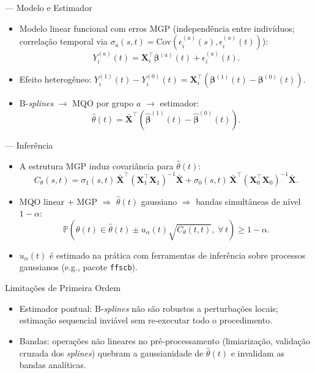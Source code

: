 \documentclass{beamer}
\begin{document}
\begin{frame}{ — Modelo e Estimador}
\begin{itemize}
    \item Modelo linear funcional com erros MGP (independência entre indivíduos; correlação temporal via \(\sigma_a(s,t) = \mathrm{Cov}(\epsilon_i^{(a)}(s),\epsilon_i^{(a)}(t))\)):
    \[
        Y_i^{(a)}(t) = \mathbf{X}_i^\top \boldsymbol{\beta}^{(a)}(t) + \epsilon_i^{(a)}(t).
    \]
    \item Efeito heterogêneo: \(Y_i^{(1)}(t) - Y_i^{(0)}(t) = \mathbf{X}_i^\top\!\left(\boldsymbol{\beta}^{(1)}(t) - \boldsymbol{\beta}^{(0)}(t)\right).\)
    \item B-\textit{splines} \(\to\) MQO por grupo \(a\) \(\to\) estimador:
    \[
        \hat{\theta}(t) = \bar{\mathbf{X}}^\top\!\left(\hat{\boldsymbol{\beta}}^{(1)}(t) - \hat{\boldsymbol{\beta}}^{(0)}(t)\right).
    \]
\end{itemize}
\end{frame}

\begin{frame}{ — Inferência}
\begin{itemize}
    \item A estrutura MGP induz covariância para \(\hat{\theta}(t)\):
    \[
        C_\theta(s,t) = \sigma_1(s,t)\,\bar{\mathbf{X}}^\top(\mathbf{X}_1^\top\mathbf{X}_1)^{-1}\bar{\mathbf{X}}
                      + \sigma_0(s,t)\,\bar{\mathbf{X}}^\top(\mathbf{X}_0^\top\mathbf{X}_0)^{-1}\bar{\mathbf{X}}.
    \]
    \item MQO linear + MGP \(\Rightarrow\) \(\hat{\theta}(t)\) gaussiano \(\Rightarrow\) bandas simultâneas de nível \(1{-}\alpha\):
    \[
        \mathbb{P}\!\left(\theta(t) \in \hat{\theta}(t) \pm u_\alpha(t)\sqrt{C_\theta(t,t)},\; \forall\, t\right) \geq 1 - \alpha.
    \]
    \item \(u_\alpha(t)\) é estimado na prática com ferramentas de inferência sobre processos gaussianos (e.g., pacote \texttt{ffscb}).
\end{itemize}
\end{frame}

\begin{frame}{Limitações de Primeira Ordem}
\begin{itemize}
    \item Estimador pontual: B-\textit{splines} não são robustos a perturbações locais; estimação sequencial inviável sem re-executar todo o procedimento.
    \medskip
    \item Bandas: operações não lineares no pré-processamento (limiarização, validação cruzada dos \textit{splines}) quebram a gaussianidade de \(\hat{\theta}(t)\) e invalidam as bandas analíticas.
\end{itemize}
\end{frame}
\end{document}
